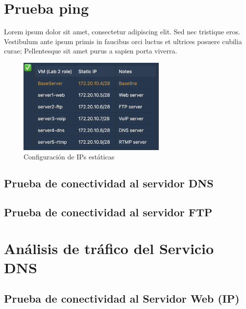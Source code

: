 \documentclass[10pt]{article}
\begin{document}
\renewcommand{\thesection}{8.\arabic{section}}
\setcounter{section}{0}
\section{Prueba ping}

Lorem ipsum dolor sit amet, consectetur adipiscing elit. Sed nec tristique eros. Vestibulum ante ipsum primis in faucibus orci luctus et ultrices posuere cubilia curae; Pellentesque sit amet purus a sapien porta viverra.


\begin{figure}[H]
    \centering
    \includegraphics[width=0.65\textwidth]{lab-02-screenshots/server-ips.png}
    \caption{Configuración de IPs estáticas}
\end{figure}


\subsection{Prueba de conectividad al servidor DNS}
\subsection{Prueba de conectividad al servidor FTP}


\renewcommand{\thesection}{8.\arabic{section}}
\setcounter{section}{0}
\section{Análisis de tráfico del Servicio DNS}
\subsection{Prueba de conectividad al Servidor Web (IP)}
\end{document}
